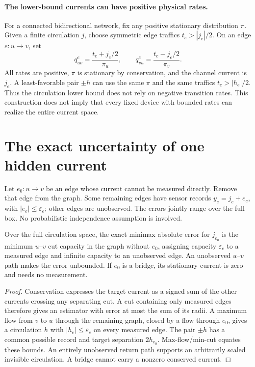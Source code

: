 \paragraph{The lower-bound currents can have positive physical rates.}
For a connected bidirectional network, fix any positive stationary distribution
$\pi$. Given a finite circulation $j$, choose symmetric edge traffics
$t_e>|j_e|/2$. On an edge $e:u\to v$, set
\[
 q^e_{uv}=\frac{t_e+j_e/2}{\pi_u},\qquad
 q^e_{vu}=\frac{t_e-j_e/2}{\pi_v}.
\]
All rates are positive, $\pi$ is stationary by conservation, and the channel
current is $j_e$. A least-favorable pair $\pm h$ can use the same $\pi$ and
the same traffics $t_e>|h_e|/2$. Thus the circulation lower bound does not rely
on negative transition rates. This construction does not imply that every
fixed device with bounded rates can realize the entire current space.

\section{The exact uncertainty of one hidden current}

Let $e_0:u\to v$ be an edge whose current cannot be measured directly. Remove
that edge from the graph. Some remaining edges have sensor records
$y_e=j_e+e_e$, with $|e_e|\leq\varepsilon_e$; other edges are unobserved.
The errors jointly range over the full box. No probabilistic independence
assumption is involved.

\begin{proposition}
\label{prop:res-current-cut}
Over the full circulation space, the exact minimax absolute error for $j_{e_0}$
is the minimum $u$--$v$ cut capacity in the graph without $e_0$, assigning
capacity $\varepsilon_e$ to a measured edge and infinite capacity to an
unobserved edge. An unobserved $u$--$v$ path makes the error unbounded. If
$e_0$ is a bridge, its stationary current is zero and needs no measurement.
\end{proposition}

\begin{proof}
Conservation expresses the target current as a signed sum of the other currents
crossing any separating cut. A cut containing only measured edges therefore
gives an estimator with error at most the sum of its radii. A maximum flow from
$v$ to $u$ through the remaining graph, closed by a flow through $e_0$, gives a
circulation $h$ with $|h_e|\leq\varepsilon_e$ on every measured edge. The pair
$\pm h$ has a common possible record and target separation $2h_{e_0}$.
Max-flow/min-cut equates these bounds. An entirely unobserved return path
supports an arbitrarily scaled invisible circulation. A bridge cannot carry
a nonzero conserved current.
\end{proof}

